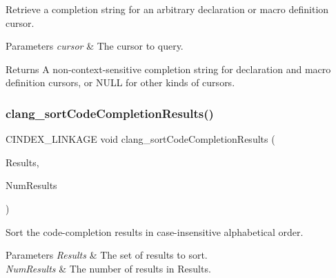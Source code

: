 Retrieve a completion string for an arbitrary declaration or macro definition cursor. 


\begin{DoxyParams}{Parameters}
{\em cursor} & The cursor to query.\\
\hline
\end{DoxyParams}
\begin{DoxyReturn}{Returns}
A non-\/context-\/sensitive completion string for declaration and macro definition cursors, or N\+U\+LL for other kinds of cursors. 
\end{DoxyReturn}
\mbox{\label{group__CINDEX__CODE__COMPLET_gaf2625ffd90004cf3202c7f9112eb3fe7}} 
\subsubsection{\texorpdfstring{clang\+\_\+sort\+Code\+Completion\+Results()}{clang\_sortCodeCompletionResults()}}
{\footnotesize\ttfamily C\+I\+N\+D\+E\+X\+\_\+\+L\+I\+N\+K\+A\+GE void clang\+\_\+sort\+Code\+Completion\+Results (\begin{DoxyParamCaption}\item[{\hyperlink{structCXCompletionResult}{C\+X\+Completion\+Result} $\ast$}]{Results,  }\item[{unsigned}]{Num\+Results }\end{DoxyParamCaption})}



Sort the code-\/completion results in case-\/insensitive alphabetical order. 


\begin{DoxyParams}{Parameters}
{\em Results} & The set of results to sort. \\
\hline
{\em Num\+Results} & The number of results in {\ttfamily Results}. \\
\hline
\end{DoxyParams}
